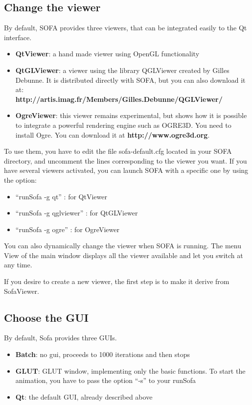 \subsection{Change the viewer}
By default, SOFA provides three viewers, that can be integrated easily to the Qt interface. 

\begin{itemize}
 \item {\bf QtViewer}: a hand made viewer using OpenGL functionality
 \item {\bf QtGLViewer}: a viewer using the library QGLViewer created by Gilles Debunne. It is distributed directly with SOFA, but you can also download it at:\\ {\bf http://artis.imag.fr/Members/Gilles.Debunne/QGLViewer/}
 \item {\bf OgreViewer}: this viewer remains experimental, but shows how it is possible to integrate a powerful rendering engine such as OGRE3D. You need to install Ogre. You can download it at {\bf http://www.ogre3d.org}.
\end{itemize}

To use them, you have to edit the file sofa-default.cfg located in your SOFA directory, and uncomment the lines corresponding to the viewer you want. If you have several viewers activated, you can launch SOFA with a specific one by using the option:
\begin{itemize}
 \item ``runSofa -g qt'' : for QtViewer
 \item ``runSofa -g qglviewer'' : for QtGLViewer
 \item ``runSofa -g ogre'' : for OgreViewer
\end{itemize}

You can also dynamically change the viewer when SOFA is running. The menu View of the main window displays all the viewer available and let you switch at any time.
\par
If you desire to create a new viewer, the first step is to make it derive from SofaViewer. 








\subsection{Choose the GUI}
By default, Sofa provides three GUIs.
\begin{itemize}
 \item {\bf Batch}: no gui, proceeds to 1000 iterations and then stops
 \item {\bf GLUT}: GLUT window, implementing only the basic functions. To start the animation, you have to pass the option ``-s'' to your runSofa
 \item {\bf Qt}: the default GUI, already described above
\end{itemize}

